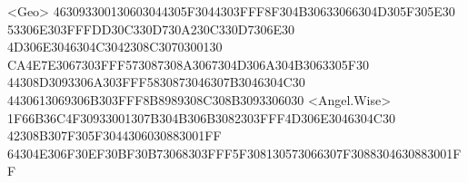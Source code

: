 <Geo> {46}{30}{93}{30}{01}{30}{60}{30}{44}{30}{5F}{30}{44}{30}{3F}{FF}{8F}{30}{4B}{30}{63}{30}{66}{30}{4D}{30}{5F}{30}{5E}{30} 
{53}{30}{6E}{30}{3F}{FF}{DD}{30}{C3}{30}{D7}{30}{A2}{30}{C3}{30}{D7}{30}{6E}{30} {4D}{30}{6E}{30}{46}{30}{4C}{30}{42}{30}{8C}{30}{70}{30}{01}{30} 
{CA}{4E}{7E}{30}{67}{30}{3F}{FF}{57}{30}{87}{30}{8A}{30}{67}{30}{4D}{30}{6A}{30}{4B}{30}{63}{30}{5F}{30} {44}{30}{8D}{30}{93}{30}{6A}{30}{3F}{FF}{58}{30}{87}{30}{46}{30}{7B}{30}{46}{30}{4C}{30} {44}{30}{61}{30}{69}{30}{6B}{30}{3F}{FF}{8B}{89}{89}{30}{8C}{30}{8B}{30}{93}{30}{60}{30} 
<Angel.Wise> {1F}{66}{B3}{6C}{4F}{30}{93}{30}{01}{30}{7B}{30}{4B}{30}{6B}{30}{82}{30}{3F}{FF}{4D}{30}{6E}{30}{46}{30}{4C}{30} {42}{30}{8B}{30}{7F}{30}{5F}{30}{44}{30}{60}{30}{88}{30}{01}{FF} {64}{30}{4E}{30}{6F}{30}{EF}{30}{BF}{30}{B7}{30}{68}{30}{3F}{FF}{5F}{30}{81}{30}{57}{30}{66}{30}{7F}{30}{88}{30}{46}{30}{88}{30}{01}{FF} 
